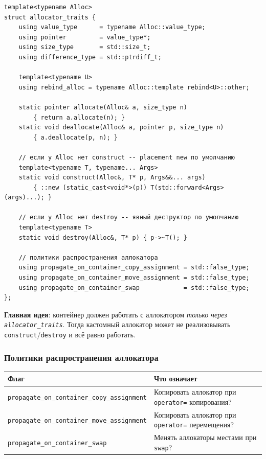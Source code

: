 \documentclass[a4paper,12pt]{article}
\begin{document}
\begin{lstlisting}
template<typename Alloc>
struct allocator_traits {
    using value_type      = typename Alloc::value_type;
    using pointer         = value_type*;
    using size_type       = std::size_t;
    using difference_type = std::ptrdiff_t;

    template<typename U>
    using rebind_alloc = typename Alloc::template rebind<U>::other;

    static pointer allocate(Alloc& a, size_type n)
        { return a.allocate(n); }
    static void deallocate(Alloc& a, pointer p, size_type n)
        { a.deallocate(p, n); }

    // если у Alloc нет construct -- placement new по умолчанию
    template<typename T, typename... Args>
    static void construct(Alloc&, T* p, Args&&... args)
        { ::new (static_cast<void*>(p)) T(std::forward<Args>(args)...); }

    // если у Alloc нет destroy -- явный деструктор по умолчанию
    template<typename T>
    static void destroy(Alloc&, T* p) { p->~T(); }

    // политики распространения аллокатора
    using propagate_on_container_copy_assignment = std::false_type;
    using propagate_on_container_move_assignment = std::false_type;
    using propagate_on_container_swap            = std::false_type;
};
\end{lstlisting}

\textbf{Главная идея}: контейнер должен работать с аллокатором
\textit{только через \texttt{allocator\_traits}}. Тогда кастомный
аллокатор может не реализовывать \texttt{construct}/\texttt{destroy}
и всё равно работать.

\subsubsection{Политики распространения аллокатора}

\begin{center}
\begin{tabular}{lp{7.5cm}}
\toprule
\textbf{Флаг} & \textbf{Что означает} \\
\midrule
\texttt{propagate\_on\_container\_copy\_assignment}
    & Копировать аллокатор при \texttt{operator=} копирования? \\
\addlinespace
\texttt{propagate\_on\_container\_move\_assignment}
    & Копировать аллокатор при \texttt{operator=} перемещения? \\
\addlinespace
\texttt{propagate\_on\_container\_swap}
    & Менять аллокаторы местами при \texttt{swap}? \\
\bottomrule
\end{tabular}
\end{center}
\end{document}
